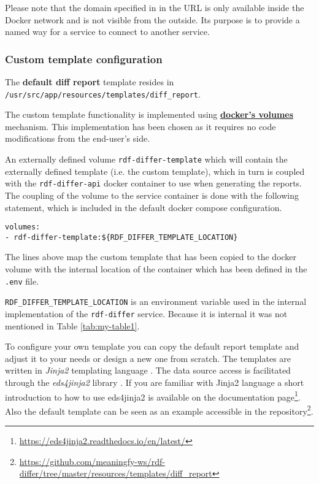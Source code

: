 	Please note that the domain specified in in the URL is only available inside the Docker network and is not visible from the outside. Its purpose is to provide a named way for a service to connect to another service. 

		\subsubsection{Custom template configuration}
		The \textbf{default diff report} template resides in \\ \texttt{/usr/src/app/resources/templates/diff\_report}.

		The custom template functionality is implemented using \textbf{\href{https://docs.docker.com/storage/volumes/}{docker's volumes}} mechanism. This implementation has been chosen as it requires no code modifications from the end-user's side.
		
		An externally defined volume \texttt{rdf-differ-template} which will contain the externally defined template (i.e. the custom template), which in turn is coupled with the \texttt{rdf-differ-api} docker container to use when generating the reports. The coupling of the volume to the service container is done with the following statement, which is included in the default docker compose configuration. 

		\begin{lstlisting}[]
volumes:
- rdf-differ-template:${RDF_DIFFER_TEMPLATE_LOCATION}
		\end{lstlisting}

		The lines above map the custom template that has been copied to the docker volume with the internal location of the container which has been defined in the \texttt{.env} file.
		
		\texttt{RDF\_DIFFER\_TEMPLATE\_LOCATION} is an environment variable used in the internal implementation of the \texttt{rdf-differ} service. Because it is internal it was not mentioned in Table \ref{tab:my-table1}.
		
		To configure your own template you can copy the default report template and adjust it to your needs or design a new one from scratch. 
		The templates are written in \textit{Jinja2} templating language \citep{jinja2}. The data source access is facilitated through the \textit{eds4jinja2} library \citep{eds4jinja2}. If you are familiar with Jinja2 language a short introduction to how to use eds4jinja2 is available on the documentation page\footnote{\url{https://eds4jinja2.readthedocs.io/en/latest/}}. Also the default template can be seen as an example accessible in the repository\footnote{\url{https://github.com/meaningfy-ws/rdf-differ/tree/master/resources/templates/diff_report}}.
		 

